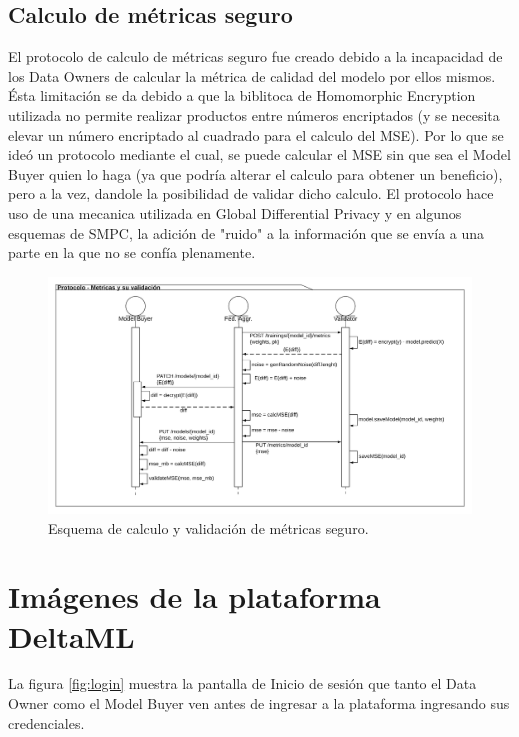 \documentclass[
11pt, %
oneside, %
spanish, %
singlespacing, %
parskip, %
headsepline, %
chapterinoneline, %
]{MastersDoctoralThesis} %
\begin{document}
\subsection*{Calculo de métricas seguro}

El protocolo de calculo de métricas seguro fue creado debido a la incapacidad de los Data Owners de calcular la métrica de calidad del modelo por ellos mismos. Ésta limitación se da debido a que la biblitoca de Homomorphic Encryption utilizada no permite realizar productos entre números encriptados (y se necesita elevar un número encriptado al cuadrado para el calculo del MSE). Por lo que se ideó un protocolo mediante el cual, se puede calcular el MSE sin que sea el Model Buyer quien lo haga (ya que podría alterar el calculo para obtener un beneficio), pero a la vez, dandole la posibilidad de validar dicho calculo.
El protocolo hace uso de una mecanica utilizada en Global Differential Privacy y en algunos esquemas de SMPC, la adición de "ruido" a la información que se envía a una parte en la que no se confía plenamente.

\begin{figure}[H]
  	\centering
	\includegraphics[scale=0.1]{imgs/flujo_valid.png}
	\caption{Esquema de calculo y validación de métricas seguro.}
	\label{fig:flujo_valid}
\end{figure}


\section{Imágenes de la plataforma DeltaML}

La figura \ref{fig:login} muestra la pantalla de Inicio de sesión que tanto el Data Owner como el Model Buyer ven antes de ingresar a la plataforma ingresando sus credenciales.
\end{document}
